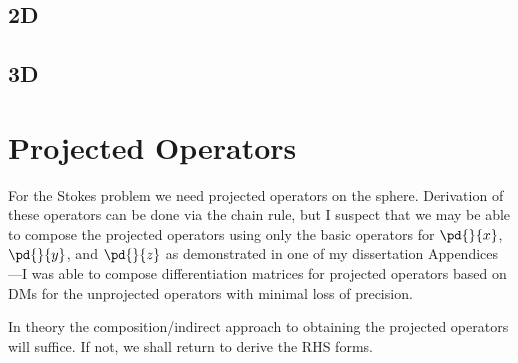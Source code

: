 \documentclass[11pt]{report}
\begin{document}
{\subsection{2D}

\subsection{3D}


\section{Projected Operators}

For the Stokes problem we need projected operators on the sphere. Derivation of these operators can be done via the chain rule, but I suspect that we may be able to compose the projected operators using only the basic operators for $\pd{}{x}$,  $\pd{}{y}$, and $\pd{}{z}$ as demonstrated in one of my dissertation Appendices---I was able to compose differentiation matrices for projected operators based on DMs for the unprojected operators with minimal loss of precision. 

In theory the composition/indirect approach to obtaining the projected operators will suffice. If not, we shall return to derive the RHS forms. 


}

%
%
\end{document}
